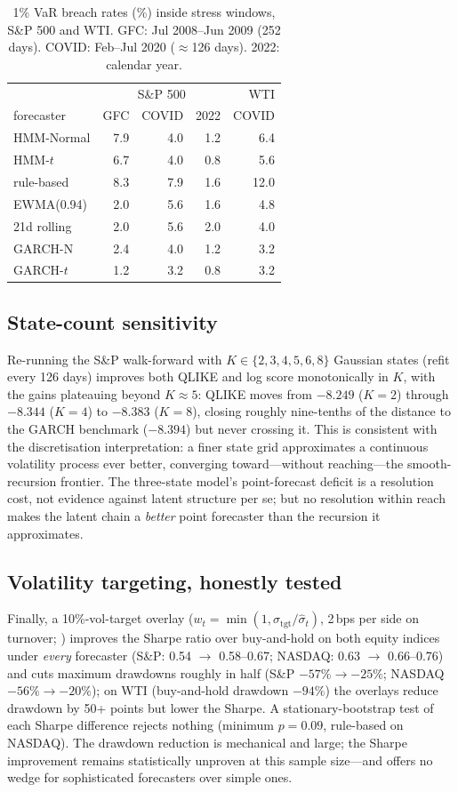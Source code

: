 \documentclass[11pt]{article}
\begin{document}
\begin{table}[t]
\centering
\caption{1\% VaR breach rates (\%) inside stress windows, S\&P 500 and
WTI. GFC: Jul 2008--Jun 2009 (252 days). COVID: Feb--Jul 2020
($\approx$126 days). 2022: calendar year.}
\label{tab:crisis}
\begin{tabular}{lrrrr}
\toprule
& \multicolumn{3}{c}{S\&P 500} & WTI \\
forecaster & GFC & COVID & 2022 & COVID \\
\midrule
HMM-Normal  & 7.9 & 4.0 & 1.2 & 6.4 \\
HMM-$t$     & 6.7 & 4.0 & 0.8 & 5.6 \\
rule-based  & 8.3 & 7.9 & 1.6 & 12.0 \\
EWMA(0.94)  & 2.0 & 5.6 & 1.6 & 4.8 \\
21d rolling & 2.0 & 5.6 & 2.0 & 4.0 \\
GARCH-N     & 2.4 & 4.0 & 1.2 & 3.2 \\
GARCH-$t$   & 1.2 & 3.2 & 0.8 & 3.2 \\
\bottomrule
\end{tabular}
\end{table}

\subsection{State-count sensitivity}\label{sec:k}
Re-running the S\&P walk-forward with $K\in\{2,3,4,5,6,8\}$ Gaussian
states (refit every 126 days) improves both QLIKE and log score
monotonically in $K$, with the gains plateauing beyond $K\approx5$:
QLIKE moves from $-8.249$ ($K{=}2$) through $-8.344$ ($K{=}4$) to
$-8.383$ ($K{=}8$), closing roughly nine-tenths of the distance to the
GARCH benchmark ($-8.394$) but never crossing it. This is consistent with
the discretisation interpretation: a finer state grid approximates a
continuous volatility process ever better, converging toward---without
reaching---the smooth-recursion frontier. The three-state model's
point-forecast deficit is a resolution cost, not evidence against latent
structure per se; but no resolution within reach makes the latent chain a
\emph{better} point forecaster than the recursion it approximates.

\subsection{Volatility targeting, honestly tested}
Finally, a 10\%-vol-target overlay ($w_t=\min(1,
\sigma_{\text{tgt}}/\hat\sigma_t)$, 2\,bps per side on turnover;
\citealp{moreira2017}) improves the Sharpe ratio over buy-and-hold on both
equity indices under \emph{every} forecaster (S\&P: 0.54 $\to$ 0.58--0.67;
NASDAQ: 0.63 $\to$ 0.66--0.76) and cuts maximum drawdowns roughly in half
(S\&P $-57\%\to-25\%$; NASDAQ $-56\%\to-20\%$); on WTI (buy-and-hold
drawdown $-94\%$) the overlays reduce drawdown by 50+ points but lower the
Sharpe. A stationary-bootstrap test of each Sharpe difference rejects
nothing (minimum $p=0.09$, rule-based on NASDAQ). The drawdown reduction
is mechanical and large; the Sharpe improvement remains statistically
unproven at this sample size---and offers no wedge for sophisticated
forecasters over simple ones.
\end{document}
